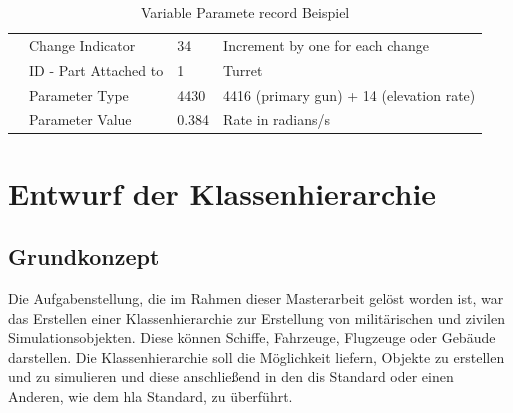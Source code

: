 \begin{table}[H]
{\begin{tabular}{|l|l|l|l|}
			& Change Indicator      & 34             & Increment by one for each change         \\ \cline{2-4} 
			& ID - Part Attached to & 1              & Turret                             \\ \cline{2-4} 
			& Parameter Type        & 4430           & 4416 (primary gun) + 14 (elevation rate) \\ \cline{2-4} 
			& Parameter Value       &0.384         & Rate in radians/s                        \\ \hline
	\end{tabular}}
	\caption[Variable Parameter record Beispiel ]{Variable Paramete record Beispiel\cite{SISOStandardsActivityCommitteeoftheIEEEComputerSociety.}}
	\label{variableex}
\end{table}


\chapter{Entwurf der Klassenhierarchie }


\section{Grundkonzept}
Die Aufgabenstellung, die im Rahmen dieser Masterarbeit gelöst worden ist, war das Erstellen einer Klassenhierarchie zur Erstellung von militärischen und zivilen Simulationsobjekten. Diese können Schiffe, Fahrzeuge, Flugzeuge oder Gebäude darstellen. Die Klassenhierarchie soll die Möglichkeit liefern, Objekte zu erstellen und zu simulieren und  diese anschließend in  den \ac{dis} Standard oder einen Anderen,  wie dem \ac{hla} Standard, zu überführt.   
 
